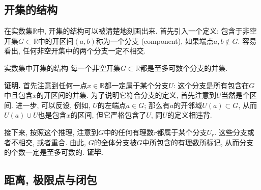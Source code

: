 \subsection{开集的结构}
在实数集$\mathbb{R}$中, 开集的结构可以被清楚地刻画出来. 首先引入一个定义: 包含于非空开集$G\subset\mathbb{R}$中的开区间$(a,b)$称为一个分支 (component), 如果端点$a,b\notin G$. 容易看出, 任何非空开集中的两个分支一定不相交.

\begin{theorem}{实数集中开集的结构}
每一个非空开集$G\subset\mathbb{R}$都是至多可数个分支的并集. 
\end{theorem}
\textbf{证明.} 首先注意到任何一点$x\in\mathbb{R}$都一定属于某个分支$U$: 这个分支是所有包含在$G$中且包含$x$的开区间的并集. 为了说明它符合分支的定义, 首先注意到$U$当然是个区间. 进一步, 可以反设, 例如, $U$的左端点$a\in G$; 那么有$a$的开邻域$U(a)\subset G$, 从而$U(a)\cup U$也是包含$x$的区间, 但它严格包含了$U$, 同$U$的定义相违背.

接下来, 按照这个推理, 注意到$G$中的任何有理数$r$都属于某个分支$U_r$. 这些分支或者不相交, 或者重合. 由此, $G$的全体分支被$G$中所包含的有理数所标记, 从而分支的个数一定是至多可数的. \textbf{证毕.}

\subsection{距离, 极限点与闭包}

